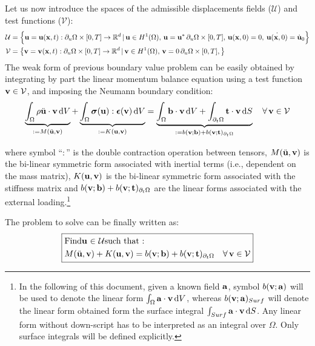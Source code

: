 Let us now introduce the spaces of the admissible displacements fields ($\mathcal{U}$) and test functions ($\mathcal{V}$):
%
\begin{equation}
\begin{aligned}\mathcal{U} & =\left\{ {\bf{u}}={\bf{u}}({\bf{x}},t):\partial_{u}\Omega\times[0,T]\to\mathbb{R}^{d}\,|\,{\bf{u}}\in H^{1}(\Omega),\,{\bf{u}}={\bf{u}}^{*}\,\partial_{u}\Omega\times[0,T],\,{\bf{u}}({\bf{x}},0)=0,\:\dot{{\bf{u}}({\bf{x}},0)}=\dot{{\bf{u}}}_{0}\right\} \\
\mathcal{V} & =\left\{ {\bf{v}}={\bf{v}}({\bf{x}},t):\partial_{u}\Omega\times[0,T]\to\mathbb{R}^{d}\,|\,{\bf{v}}\in H^{1}(\Omega),\,{\bf{v}}=0\,\partial_{u}\Omega\times[0,T],\right\} 
\end{aligned}
\end{equation}
%
The weak form of previous boundary value problem can be easily obtained
by integrating by part the linear momentum balance equation using
a test function ${\bf{v}}\in\mathcal{V}$, and imposing the Neumann boundary
condition:
%
\begin{equation}
%
\underbrace{\int_{\Omega}\rho\ddot{\bu}\cdot\bv\,{\rm d}V}_{:=M(\ddot{\bu},\bv)}+\underbrace{\int_{\Omega}\bsigma(\bu):\bepsilon(\bv)\,{\rm d}V}_{:=K(\bu,\bv)}=\underbrace{\int_{\Omega}\bb\cdot\bv\,{\rm d}V+\int_{\partial_{t}\Omega}\bt\cdot\bv\,{\rm d}S}_{:=b(\bv;\bb)+b(\bv;\bt)_{\partial_{t}\Omega}}\quad\forall\,\bv\in\mathcal{V}
%
\end{equation}

where symbol ``$:$'' is the double contraction operation between
tensors, $M(\ddot{{\bf{u}}},{\bf{v}})$ is the bi-linear symmetric form associated
with inertial terms (i.e., dependent on the mass matrix), $K({\bf{u}},{\bf{v}})$
is the bi-linear symmetric form associated with the stiffness matrix
and $b({\bf{v}};{\bf{b}})+b({\bf{v}};{\bf t})_{\partial_{t}\Omega}$ are the linear forms
associated with the external loading.\footnote{In the following of this document, given a known field ${\bf{a}}$, symbol
$b({\bf{v}};{\bf{a}})$ will be used to denote the linear form $\int_{\Omega}{\bf{a}}\cdot{\bf{v}}\,{\rm d}V$,
whereas $b({\bf{v}};{\bf{a}})_{Surf}$ will denote the linear form obtained
form the surface integral $\int_{Surf}{\bf{a}}\cdot{\bf{v}}\,{\rm d}S$. Any
linear form without down-script has to be interpreted as an integral
over $\Omega$. Only surface integrals will be defined
explicitly.}

The problem to solve can be finally written as:
\begin{equation}
\boxed{\begin{aligned} & \text{Find} {{\bf{u}}}~{\in}~{\mathcal{U}} \text{such that : }\\
 & M(\ddot{{\bf{u}}},{\bf{v}})+K({\bf{u}},{\bf{v}})=b({\bf{v}};{\bf{b}})+b({\bf{v}};{\bf t})_{\partial_{t}\Omega}\quad\forall\,{\bf{v}}\in\mathcal{V}
\end{aligned}
}
\end{equation}

